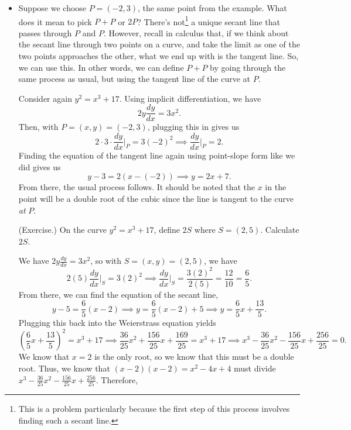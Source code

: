 \documentclass[letterpaper]{article}
\begin{document}
\begin{itemize}
    \item Suppose we choose $P = (-2, 3)$, the same point from the example. What does it mean to pick $P + P$ or $2P$? There's not\footnote{This is a problem particularly because the first step of this process involves finding such a secant line.} a unique secant line that passes through $P$ and $P$. However, recall in calculus that, if we think about the secant line through two points on a curve, and take the limit as one of the two points approaches the other, what we end up with is the tangent line. So, we can use this. In other words, we can define $P + P$ by going through the same process as usual, but using the tangent line of the curve at $P$. 
    
    \bigskip 

    Consider again $y^2 = x^3 + 17$. Using implicit differentiation, we have 
    \[2y\frac{dy}{dx} = 3x^2.\]
    Then, with $P = (x, y) = (-2, 3)$, plugging this in gives us 
    \[2 \cdot 3 \cdot \frac{dy}{dx}\bigg\rvert_{P} = 3(-2)^2 \implies \frac{dy}{dx}\bigg\rvert_{P} = 2.\]
    Finding the equation of the tangent line again using point-slope form like we did gives us 
    \[y - 3 = 2(x - (-2)) \implies y = 2x + 7.\]
    From there, the usual process follows. It should be noted that the $x$ in the point will be a double root of the cubic since the line is tangent to the curve \emph{at} $P$. 

    \begin{mdframed}
        (Exercise.) On the curve $y^2 = x^3 + 17$, define $2S$ where $S = (2, 5)$. Calculate $2S$. 

        \begin{mdframed}
            We have $2y\frac{dy}{dx} = 3x^2$, so with $S = (x, y) = (2, 5)$, we have 
            \[2(5)\frac{dy}{dx}\bigg\rvert_{S} = 3(2)^2 \implies \frac{dy}{dx}\bigg\rvert_{S} = \frac{3(2)^2}{2(5)} = \frac{12}{10} = \frac{6}{5}.\] From there, we can find the equation of the secant line,
            \[y - 5 = \frac{6}{5}(x - 2) \implies y = \frac{6}{5}(x - 2) + 5 \implies y = \frac{6}{5}x + \frac{13}{5}.\]
            Plugging this back into the Weierstrass equation yields 
            \[\left(\frac{6}{5}x + \frac{13}{5}\right)^2 = x^3 + 17 \implies \frac{36}{25}x^2 + \frac{156}{25}x + \frac{169}{25} = x^3 + 17 \implies x^3 - \frac{36}{25}x^2 - \frac{156}{25}x + \frac{256}{25} = 0.\] 
            We know that $x = 2$ is the only root, so we know that this must be a double root. Thus, we know that $(x - 2)(x - 2) = x^2 - 4x + 4$ must divide $x^3 - \frac{36}{25}x^2 - \frac{156}{25}x + \frac{256}{25}$. Therefore, 


\end{mdframed}
\end{mdframed}
\end{itemize}
\end{document}
